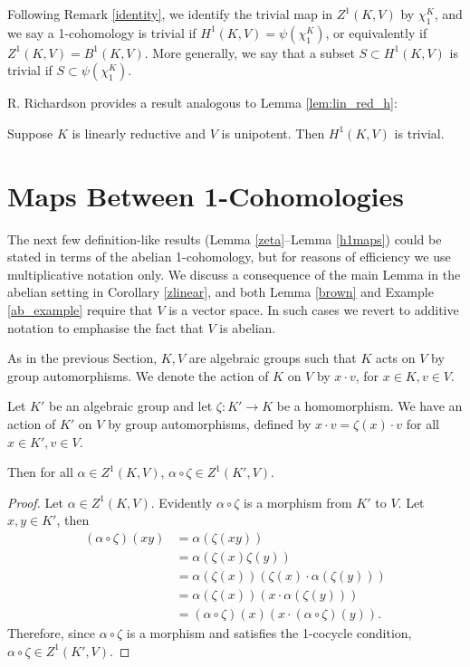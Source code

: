 \begin{remark}\label{trivial}
Following Remark \ref{identity}, we identify the trivial map in $Z^1(K, V)$ by $\chi^K_1$, and we say a 1-cohomology is trivial if $H^1(K, V) = \psi(\chi^K_1)$, or equivalently if $Z^1(K, V) = B^1(K, V)$. More generally, we say that a subset $S \subset H^1(K, V)$ is trivial if $S \subset \psi(\chi^K_1)$.
\end{remark}

R. Richardson \cite[Lemma 6.2.6]{richardson1982orbits} provides a result analogous to Lemma \ref{lem:lin_red_h}:
\begin{lemma}
  Suppose $K$ is linearly reductive and $V$ is unipotent. Then $H^1(K, V)$ is trivial.
  \label{lem:nonab_lin_red}
\end{lemma}

\section{Maps Between 1-Cohomologies}

The next few definition-like results (Lemma \ref{zeta}--Lemma \ref{h1maps}) could be stated in terms of the abelian 1-cohomology, but for reasons of efficiency we use multiplicative notation only. We discuss a consequence of the main Lemma in the abelian setting in Corollary \ref{zlinear}, and both Lemma \ref{brown} and Example \ref{ab_example} require that $V$ is a vector space. In such cases we revert to additive notation to emphasise the fact that $V$ is abelian.

As in the previous Section, $K, V$ are algebraic groups such that $K$ acts on $V$ by group automorphisms. We denote the action of $K$ on $V$ by $x \cdot v$, for $x \in K, v \in V$.

\begin{lemma} \label{zeta}
	Let $K'$ be an algebraic group and let $\zeta:K'\rightarrow K$ be a homomorphism. We have an action of $K'$ on $V$ by group automorphisms, defined by $x \cdot v = \zeta(x) \cdot v$ for all $x \in K', v \in V$.

	Then for all $\alpha \in Z^1(K, V)$, $\alpha \circ \zeta \in Z^1(K', V)$.
\end{lemma}
\begin{proof}
	Let $\alpha \in Z^1(K, V)$. Evidently $\alpha \circ \zeta$ is a morphism from $K'$ to $V$. Let $x, y \in K'$, then
	\begin{align*}
		(\alpha \circ \zeta)(xy) &= \alpha\left(\zeta(xy)\right) \\
			&= \alpha\left(\zeta(x)\zeta(y)\right) \\
			&= \alpha(\zeta(x))\left(\zeta(x) \cdot \alpha(\zeta(y))\right) \\
			&= \alpha(\zeta(x))\left(x \cdot \alpha(\zeta(y))\right) \\
			&= (\alpha\circ\zeta)(x)\left(x \cdot (\alpha\circ\zeta)(y)\right).
	\end{align*}
	Therefore, since $\alpha \circ \zeta$ is a morphism and satisfies the 1-cocycle condition, $\alpha \circ \zeta \in Z^1(K', V)$.
\end{proof}

